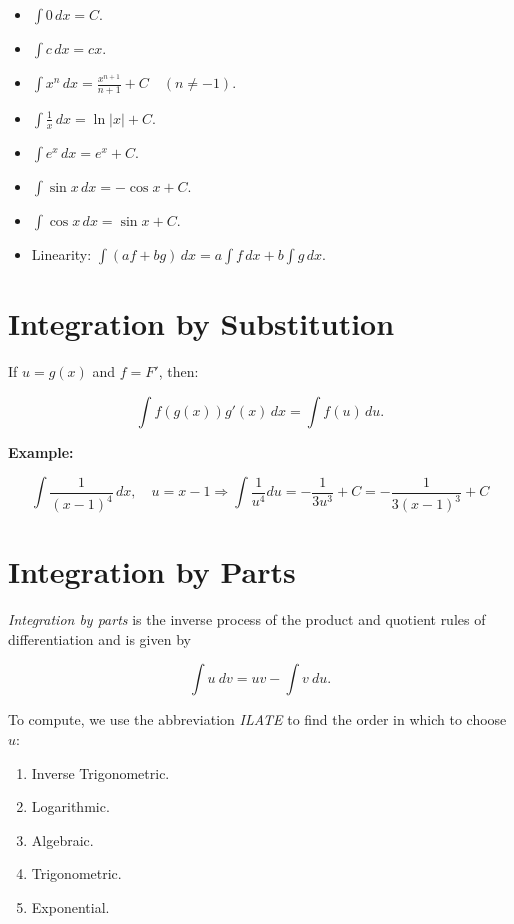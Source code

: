 \begin{itemize}

    \item \(\int 0\,dx = C\).

    \item \(\int c\,dx = cx\).

    \item \(\int x^n\,dx = \frac{x^{n+1}}{n+1} + C \quad (n \ne -1)\).

    \item \(\int \frac{1}{x}\,dx = \ln|x| + C\).

    \item \(\int e^x\,dx = e^x + C\).

    \item \(\int \sin x\,dx = -\cos x + C\).

    \item \(\int \cos x\,dx = \sin x + C\).

    \item Linearity: \(\int (af + bg)\,dx = a\int f\,dx + b\int g\,dx\).

\end{itemize}

\section{Integration by Substitution}

If \(u = g(x)\) and \(f = F'\), then:

\[
    \int f(g(x))g'(x)\,dx = \int f(u)\,du.
\]

\textbf{Example:}

\[
    \int \frac{1}{{(x - 1)}^4}\,dx, \quad u = x - 1 \Rightarrow \int \frac{1}{u^4} du = -\frac{1}{3u^3} + C = -\frac{1}{3{(x - 1)}^3} + C
\]

\section{Integration by Parts}

\emph{Integration by parts} is the inverse process of the product and quotient rules of differentiation and is given by 

\[
    \int u\ dv = uv - \int v \ du.
\]

To compute, we use the abbreviation \emph{ILATE} to find the order in which to choose \(u\):

\begin{enumerate}

    \item Inverse Trigonometric.

    \item Logarithmic.

    \item Algebraic.

    \item Trigonometric.

    \item Exponential.

\end{enumerate}

